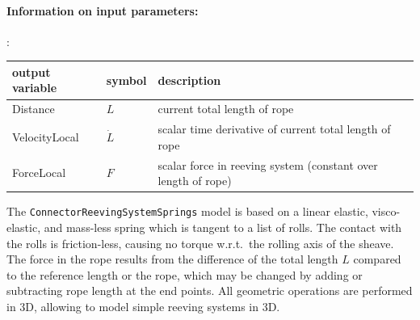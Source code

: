 \paragraph{Information on input parameters:} 
\finishTable

:
\begin{center}
\footnotesize
\begin{longtable}{| p{5cm} | p{5cm} | p{6cm} |} 
\hline
\bf output variable & \bf symbol & \bf description \\ \hline
Distance & $L$ & current total length of rope\\ \hline
VelocityLocal & $\dot L$ & scalar time derivative of current total length of rope\\ \hline
ForceLocal & $F$ & scalar force in reeving system (constant over length of rope)\\ \hline
\end{longtable}
\end{center}
 \noindent
    The \texttt{ConnectorReevingSystemSprings} model is based on a linear elastic, visco-elastic, and mass-less spring which
    is tangent to a list of rolls. The contact with the rolls is friction-less, causing no torque w.r.t.\ the rolling axis of the sheave.
    The force in the rope results from the difference of the total length $L$ compared to the reference length or the rope, which 
    may be changed by adding or subtracting rope length at the end points. All geometric operations are performed in 3D, allowing to model
    simple reeving systems in 3D.
    
